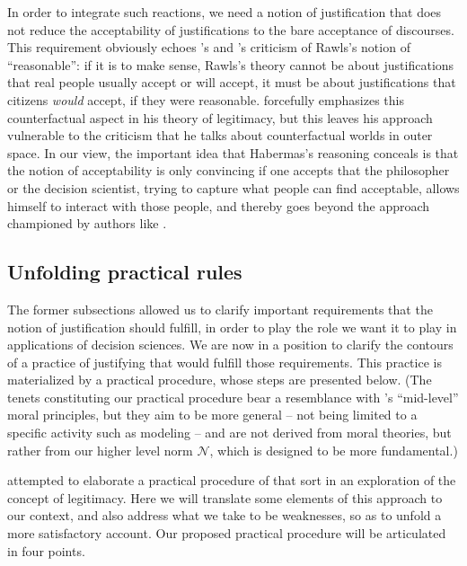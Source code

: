 \documentclass[preprint, french, english, 11pt, authoryear]{elsarticle}%
\newcommand{\possessivecite}[1]{\citeauthor{#1}’s \citeyearpar{#1}}
\begin{document}
In order to integrate such reactions, we need a notion of justification that does not reduce the acceptability of justifications to the bare acceptance of discourses. 
This requirement obviously echoes \citeauthor{habermas_reconciliation_1995}’s and \citeauthor{estlund_democratic_2009}’s criticism of Rawls's notion of “reasonable”: 
if it is to make sense, Rawls's theory cannot be about justifications that real people usually accept or will accept, it must be about justifications that citizens \emph{would} accept, if they were reasonable. 
\citet{habermas_faktizitat_1992} forcefully emphasizes this counterfactual aspect in his theory of legitimacy, but this leaves his approach vulnerable to the criticism that he talks about counterfactual worlds in outer space. 
In our view, the important idea that Habermas's reasoning conceals is that the notion of acceptability is only convincing if one accepts that the philosopher or the decision scientist, trying to capture what people can find acceptable, 
allows himself to interact with those people, and thereby goes beyond the approach championed by authors like \cite{boltanski_justification_2006}.

\subsection{Unfolding practical rules}
The former subsections allowed us to clarify important requirements that the notion of justification should fulfill, in order to play the role we want it to play in applications of decision sciences. 
We are now in a position to clarify the contours of a practice of justifying that would fulfill those requirements. This practice is materialized by a practical procedure, whose steps are presented below. 
(The tenets constituting our practical procedure bear a resemblance with \possessivecite{diekmann_moral_2013} ``mid-level'' moral principles, but they aim to be more general -- not being limited to a specific activity such as modeling -- 
and are not derived from moral theories, but rather from our higher level norm $\mathscr{N}$, which is designed to be more fundamental.)

\citet{meinard_what_2017} attempted to elaborate a practical procedure of that sort in an exploration of the concept of legitimacy. Here we will translate some elements of this approach to our context, and also address what we take to be weaknesses, so as to unfold a more satisfactory account. 
Our proposed practical procedure will be articulated in four points.
\end{document}
